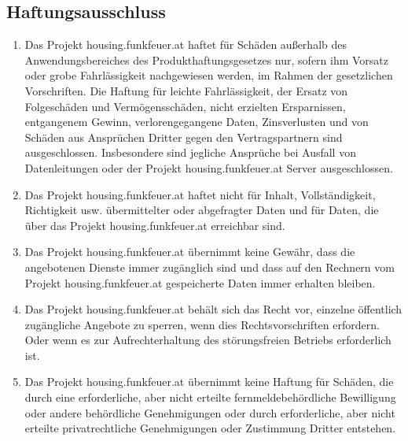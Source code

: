 \documentclass[parskip=half]{article}
\begin{document}
\subsection{Haftungsausschluss}
\begin{enumerate}
\item Das Projekt housing.funkfeuer.at haftet für Schäden außerhalb des
Anwendungsbereiches des Produkthaftungsgesetzes nur, sofern ihm Vorsatz oder grobe
Fahrlässigkeit nachgewiesen werden, im Rahmen der gesetzlichen Vorschriften. Die
Haftung für leichte Fahrlässigkeit, der Ersatz von Folgeschäden und Vermögensschäden, nicht erzielten Ersparnissen, entgangenem Gewinn, verlorengegangene Daten, Zinsverlusten und
von Schäden aus Ansprüchen Dritter gegen den Vertragspartnern sind ausgeschlossen. Insbesondere sind jegliche Ansprüche bei Ausfall von Datenleitungen oder der Projekt housing.funkfeuer.at Server ausgeschlossen.
\item Das Projekt housing.funkfeuer.at haftet nicht für Inhalt, Vollständigkeit, Richtigkeit usw.
übermittelter oder abgefragter Daten und für Daten, die über das Projekt
housing.funkfeuer.at erreichbar sind.
\item Das Projekt housing.funkfeuer.at übernimmt keine Gewähr, dass die angebotenen
Dienste immer zugänglich sind und dass auf den Rechnern vom Projekt
housing.funkfeuer.at gespeicherte Daten immer erhalten bleiben.
\item Das Projekt housing.funkfeuer.at behält sich das Recht vor, einzelne öffentlich
zugängliche Angebote zu sperren, wenn dies Rechtsvorschriften erfordern. Oder wenn es
zur Aufrechterhaltung des störungsfreien Betriebs erforderlich ist.
\item Das Projekt housing.funkfeuer.at übernimmt keine Haftung für Schäden, die durch
eine erforderliche, aber nicht erteilte fernmeldebehördliche Bewilligung oder andere
behördliche Genehmigungen oder durch erforderliche, aber nicht erteilte privatrechtliche
Genehmigungen oder Zustimmung Dritter entstehen.
\end{enumerate}
\end{document}
